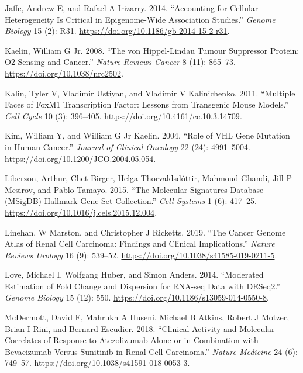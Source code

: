 \documentclass[
  12pt,
]{article}
\newlength{\cslhangindent}
\newenvironment{CSLReferences}[2] %
 {\begin{list}{}{%
  \setlength{\itemindent}{0pt}
  \setlength{\leftmargin}{0pt}
  \setlength{\parsep}{0pt}
  \ifodd #1
   \setlength{\leftmargin}{\cslhangindent}
   \setlength{\itemindent}{-1\cslhangindent}
  \fi
  \setlength{\itemsep}{#2\baselineskip}}}
 {\end{list}}
\begin{document}
\begin{CSLReferences}{1}{1}
Jaffe, Andrew E, and Rafael A Irizarry. 2014. {``Accounting for Cellular
Heterogeneity Is Critical in Epigenome-Wide Association Studies.''}
\emph{Genome Biology} 15 (2): R31.
\url{https://doi.org/10.1186/gb-2014-15-2-r31}.

Kaelin, William G Jr. 2008. {``The {von Hippel-Lindau} Tumour Suppressor
Protein: {O2} Sensing and Cancer.''} \emph{Nature Reviews Cancer} 8
(11): 865--73. \url{https://doi.org/10.1038/nrc2502}.

Kalin, Tyler V, Vladimir Ustiyan, and Vladimir V Kalinichenko. 2011.
{``Multiple Faces of {FoxM1} Transcription Factor: Lessons from
Transgenic Mouse Models.''} \emph{Cell Cycle} 10 (3): 396--405.
\url{https://doi.org/10.4161/cc.10.3.14709}.

Kim, William Y, and William G Jr Kaelin. 2004. {``Role of {VHL} Gene
Mutation in Human Cancer.''} \emph{Journal of Clinical Oncology} 22
(24): 4991--5004. \url{https://doi.org/10.1200/JCO.2004.05.054}.

Liberzon, Arthur, Chet Birger, Helga Thorvaldsdóttir, Mahmoud Ghandi,
Jill P Mesirov, and Pablo Tamayo. 2015. {``The Molecular Signatures
Database ({MSigDB}) Hallmark Gene Set Collection.''} \emph{Cell Systems}
1 (6): 417--25. \url{https://doi.org/10.1016/j.cels.2015.12.004}.

Linehan, W Marston, and Christopher J Ricketts. 2019. {``The Cancer
Genome Atlas of Renal Cell Carcinoma: Findings and Clinical
Implications.''} \emph{Nature Reviews Urology} 16 (9): 539--52.
\url{https://doi.org/10.1038/s41585-019-0211-5}.

Love, Michael I, Wolfgang Huber, and Simon Anders. 2014. {``Moderated
Estimation of Fold Change and Dispersion for {RNA-seq} Data with
{DESeq2}.''} \emph{Genome Biology} 15 (12): 550.
\url{https://doi.org/10.1186/s13059-014-0550-8}.

McDermott, David F, Mahrukh A Huseni, Michael B Atkins, Robert J Motzer,
Brian I Rini, and Bernard Escudier. 2018. {``Clinical Activity and
Molecular Correlates of Response to Atezolizumab Alone or in Combination
with Bevacizumab Versus Sunitinib in Renal Cell Carcinoma.''}
\emph{Nature Medicine} 24 (6): 749--57.
\url{https://doi.org/10.1038/s41591-018-0053-3}.


\end{CSLReferences}
\end{document}
